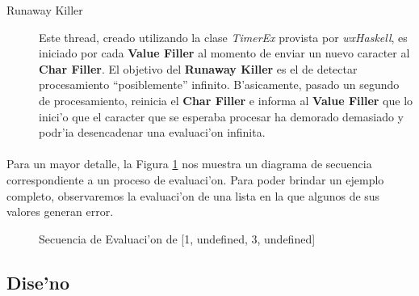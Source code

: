 \documentclass[a4paper]{article}
\begin{document}
\begin{description}
	\item[Runaway Killer] Este thread, creado utilizando la clase \textsl{TimerEx} provista por \textsl{wxHaskell}, es iniciado por cada \textbf{Value Filler} al momento de enviar un nuevo caracter al \textbf{Char Filler}.  El objetivo del \textbf{Runaway Killer} es el de detectar procesamiento ``posiblemente'' infinito.  B'asicamente, pasado un segundo de procesamiento, reinicia el \textbf{Char Filler} e informa al \textbf{Value Filler} que lo inici'o que el caracter que se esperaba procesar ha demorado demasiado y podr'ia desencadenar una evaluaci'on infinita.
\end{description}
\paragraph{}Para un mayor detalle, la Figura \ref{seq1} nos muestra un diagrama de secuencia correspondiente a un proceso de evaluaci'on.  Para poder brindar un ejemplo completo, observaremos la evaluaci'on de una lista en la que algunos de sus valores generan error.
\begin{figure}[hp]
	\begin{center}
		\caption{Secuencia de Evaluaci'on de [1, undefined, 3, undefined]}
		\label{seq1}
	\end{center}
\end{figure}

\newpage
\subsection{Dise'no}
\begin{epigraphs}
\end{epigraphs}
\end{document}
